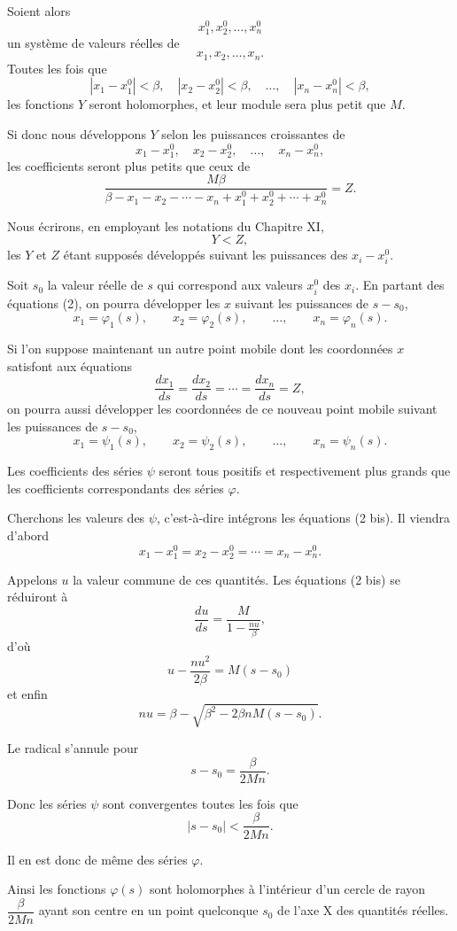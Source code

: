 \documentclass[11pt]{article}
\begin{document}
Soient alors
\[
x_1^0,x_2^0,\ldots,x_n^0
\]
un système de valeurs réelles de
\[
x_1,x_2,\ldots,x_n.
\]
Toutes les fois que
\[
|x_1-x_1^0|<\beta,
\quad |x_2-x_2^0|<\beta,
\quad \ldots,
\quad |x_n-x_n^0|<\beta,
\]
les fonctions $Y$ seront holomorphes, et leur module sera plus petit que $M$.

Si donc nous développons $Y$ selon les puissances croissantes de
\[
x_1-x_1^0,\quad x_2-x_2^0,\quad \ldots,
\quad x_n-x_n^0,
\]
les coefficients seront plus petits que ceux de
\[
\frac{M\beta}{\beta-x_1-x_2-\cdots-x_n+x_1^0+x_2^0+\cdots+x_n^0}=Z.
\]

Nous écrirons, en employant les notations du Chapitre XI,
\[
Y<Z,
\]
les $Y$ et $Z$ étant supposés développés suivant les puissances des $x_i-x_i^0$.

Soit $s_0$ la valeur réelle de $s$ qui correspond aux valeurs $x_i^0$ des $x_i$. En partant des équations (2), on pourra développer les $x$ suivant les puissances de $s-s_0$,
\[
x_1=\varphi_1(s),\qquad x_2=\varphi_2(s),\qquad \ldots,\qquad x_n=\varphi_n(s).
\]

Si l’on suppose maintenant un autre point mobile dont les coordonnées $x$ satisfont aux équations
\begin{equation}
\frac{dx_1}{ds}=\frac{dx_2}{ds}=\cdots=\frac{dx_n}{ds}=Z,
\tag{2 bis}
\end{equation}
on pourra aussi développer les coordonnées de ce nouveau point mobile suivant les puissances de $s-s_0$,
\[
x_1=\psi_1(s),\qquad x_2=\psi_2(s),\qquad \ldots,
\qquad x_n=\psi_n(s).
\]

Les coefficients des séries $\psi$ seront tous positifs et respectivement plus grands que les coefficients correspondants des séries $\varphi$.

Cherchons les valeurs des $\psi$, c’est-à-dire intégrons les équations (2 bis). Il viendra d’abord
\[
x_1-x_1^0=x_2-x_2^0=\cdots=x_n-x_n^0.
\]

Appelons $u$ la valeur commune de ces quantités. Les équations (2 bis) se réduiront à
\[
\frac{du}{ds}=\frac{M}{1-\frac{nu}{\beta}},
\]
d’où
\[
u-\frac{n u^2}{2\beta}=M(s-s_0)
\]
et enfin
\[
nu=\beta-\sqrt{\beta^2-2\beta nM(s-s_0)}.
\]

Le radical s’annule pour
\[
s-s_0=\frac{\beta}{2Mn}.
\]

Donc les séries $\psi$ sont convergentes toutes les fois que
\[
|s-s_0|<\frac{\beta}{2Mn}.
\]

Il en est donc de même des séries $\varphi$.

Ainsi les fonctions $\varphi(s)$ sont holomorphes à l’intérieur d’un cercle de rayon $\dfrac{\beta}{2Mn}$ ayant son centre en un point quelconque $s_0$ de l’axe X des quantités réelles.
\end{document}
